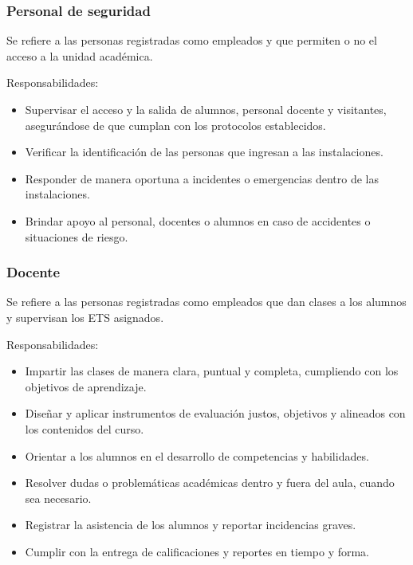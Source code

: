 \begin{Usuario}{\hypertarget{tPersonalSeguridad}{\subsubsection{Personal de seguridad}}}{
		Se refiere a las personas registradas como empleados y que permiten o no el acceso a la unidad académica.
	}
	\item[Responsabilidades:] \cdtEmpty
	\begin{itemize}
		\item Supervisar el acceso y la salida de alumnos, personal docente y visitantes, asegurándose de que cumplan con los protocolos establecidos.
		\item Verificar la identificación de las personas que ingresan a las instalaciones.
		\item Responder de manera oportuna a incidentes o emergencias dentro de las instalaciones.
		\item Brindar apoyo al personal, docentes o alumnos en caso de accidentes o situaciones de riesgo.
	\end{itemize}
	

\end{Usuario}

\begin{Usuario}{\hypertarget{tDocenteAplicador}{\subsubsection{Docente}}}{
		Se refiere a las personas registradas como empleados que dan clases a los alumnos y supervisan los ETS asignados.
	}
	\item[Responsabilidades:] \cdtEmpty
	\begin{itemize}
		\item Impartir las clases de manera clara, puntual y completa, cumpliendo con los objetivos de aprendizaje.
		\item Diseñar y aplicar instrumentos de evaluación justos, objetivos y alineados con los contenidos del curso.
		\item Orientar a los alumnos en el desarrollo de competencias y habilidades.
		\item Resolver dudas o problemáticas académicas dentro y fuera del aula, cuando sea necesario.
		\item Registrar la asistencia de los alumnos y reportar incidencias graves.
		\item Cumplir con la entrega de calificaciones y reportes en tiempo y forma.

	\end{itemize}
	

\end{Usuario}

